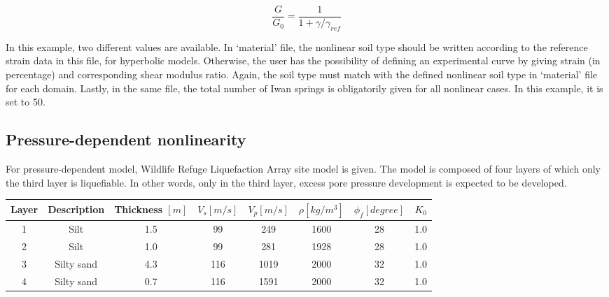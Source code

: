 \begin{equation}
\label{eqHD}
\frac{G}{G_{0}} = \frac{1}{1+ \gamma / \gamma_{ref}} 
\end{equation}


In this example, two different values are available. In ‘material’ file, the nonlinear soil type should be written according to the reference strain data in this file, for hyperbolic models. Otherwise, the user has the possibility of defining an experimental curve by giving strain (in percentage) and corresponding shear modulus ratio. Again, the soil type must match with the defined nonlinear soil type in ‘material’ file for each domain. Lastly, in the same file, the total number of Iwan springs is obligatorily given for all nonlinear cases. In this example, it is set to 50. \\


\subsection{Pressure-dependent nonlinearity}

For pressure-dependent model, Wildlife Refuge Liquefaction Array site model is given.  The model is composed of four layers of which only the third layer is liquefiable. In other words, only in the third layer, excess pore pressure development is expected to be developed. \\



\begin{center}
\begin{tabular}{|c|c|c|c|c|c|c|c|} \hline                                
Layer & Description  & Thickness $[m]$ & $V_{s} [m/s] $ &$V_{p} [m/s] $ & $\rho [kg/m^{3}]$ & $\phi_{f} [degree]$ & $K_{0}$ \\ \hline \hline 
1     & Silt    		& 1.5   & 99  & 249 &  1600 & 28  & 1.0  \\ \hline    
2     & Silt    		& 1.0   & 99  & 281 &  1928 & 28  & 1.0  \\ \hline
3     & Silty sand 	& 4.3   & 116 & 1019&  2000 & 32  & 1.0  \\ \hline
4     & Silty sand 	& 0.7   & 116 & 1591&  2000 & 32  & 1.0  \\ \hline
\end{tabular}
\label{TAB:WRLA1}
\end{center}



